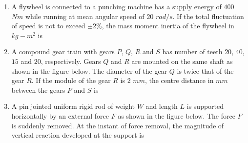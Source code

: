 \documentclass[journal,12pt,onecolumn]{IEEEtran}
\theoremstyle{remark}
\begin{document}
\begin{enumerate}
\hfill{}
\begin{enumerate}
\end{enumerate}

\item A flywheel is connected to a punching machine has a supply energy of $400$ $Nm$ while running at mean angular speed of $20$ $rad/s$. If the total fluctuation of speed is not to exceed $\pm 2\%$, the mass moment inertia of the flywheel in $kg-m^2$ is

\hfill{}
\begin{enumerate}
\end{enumerate}

\item A compound gear train with gears $P$, $Q$, $R$ and $S$ has number of teeth $20$, $40$, $15$ and $20$, respectively. Gears $Q$ and $R$ are mounted on the same shaft as shown in the figure below. The diameter of the gear $Q$ is twice that of the gear $R$. If the module of the gear $R$ is $2$ $mm$, the centre distance in $mm$ between the gears $P$ and $S$ is
\\\begin{center}
   \scalebox{0.5}{}
\end{center}

\hfill{}
\begin{enumerate}
\end{enumerate}

\item A pin jointed uniform rigid rod of weight $W$ and length $L$ is supported horizontally by an external force $F$ as shown in the figure below. The force $F$ is suddenly removed. At the instant of force removal, the magnitude of vertical reaction developed at the support is
\\\begin{center}
   \scalebox{0.5}{}
\end{center}


\end{enumerate}
\end{document}
